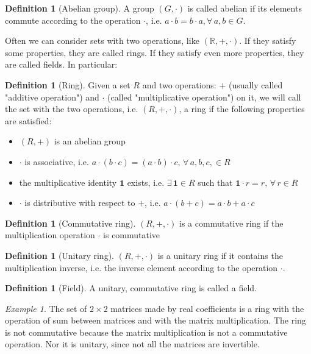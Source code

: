 \documentclass[a4paper,11pt,titlepage]{article}
\numberwithin{equation}{section}
\theoremstyle{definition}
\newtheorem{definition}[theorem]{Definition}
\theoremstyle{remark}
\newtheorem{example}[theorem]{Example}
\begin{document}
\begin{definition} [Abelian group]
A group $(G, \cdot)$ is called abelian if its elements commute according to the operation $\cdot$, i.e. $a \cdot b = b \cdot a, \forall \,  a, b \in G$.
\end{definition}

Often we can consider sets with two operations, like $(\mathbb{R}, + , \cdot)$. If they satisfy some properties, they are called rings. If they satisfy even more properties, they are called fields. In particular:

\begin{definition} [Ring]
Given a set $R$ and two operations: $+$ (usually called "additive operation") and $\cdot$ (called "multiplicative operation") on it, we will call the set with the two operations, i.e. $(R, +, \cdot)$, a ring if the following properties are satisfied:
\begin{itemize}
\item $(R, +)$ is an abelian group
\item $\cdot$ is associative, i.e. $a \cdot (b \cdot c) = (a \cdot b) \cdot c, \, \forall\, a, b, c, \in R$
\item the multiplicative identity $\mathbf{1}$ exists, i.e. $\exists\, \mathbf{1} \in R$ such that $\mathbf{1} \cdot r = r, \, \forall\, r \in R$
\item $\cdot$ is distributive with respect to $+$, i.e. $a \cdot (b + c) = a \cdot b + a \cdot c$
\end{itemize}
\end{definition}

\begin{definition} [Commutative ring] $(R, +, \cdot)$ is a commutative ring if the multiplication operation $\cdot$ is commutative
\end{definition}

\begin{definition} [Unitary ring]
$(R, +, \cdot)$ is a unitary ring if it contains the multiplication inverse, i.e. the inverse element according to the operation $\cdot$.
\end{definition}

\begin{definition} [Field]
A unitary, commutative ring is called a field.
\end{definition}

\begin{example}
The set of $2 \times 2$ matrices made by real coefficients is a ring with the operation of sum between matrices and with the matrix multiplication. The ring is not commutative because the matrix multiplication is not a commutative operation. Nor it is unitary, since not all the matrices are invertible.
\end{example}
\end{document}
